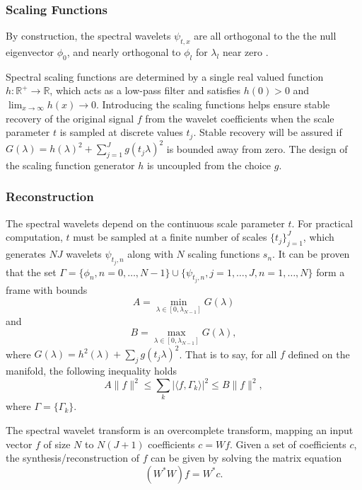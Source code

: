 \subsubsection*{Scaling Functions}
By construction, the spectral wavelets $\psi_{t,x}$ are all orthogonal to the the null eigenvector $\phi_0$,
and nearly orthogonal to $\phi_l$ for $\lambda_l$ near zero \cite{Hammond2011}.

Spectral scaling functions are determined by a single real valued function $h:\mathbb{R}^+\to\mathbb{R}$,
which acts as a low-pass filter and satisfies $h(0)>0$ and $\lim_{x\to\infty}h(x)\to 0$.
Introducing the scaling functions helps ensure stable recovery of the original signal $f$ from the wavelet
coefficients when the scale parameter $t$ is sampled at discrete values ${t_j}$.
Stable recovery will be assured if $G(\lambda)=h(\lambda)^2+\sum_{j=1}^J g(t_j\lambda)^2$ is
bounded away from zero. The design of the scaling function generator $h$ is uncoupled from the choice $g$.

\subsubsection*{Reconstruction}

The spectral wavelets depend on the continuous scale parameter $t$. For practical computation,
$t$ must be sampled at a finite number of scales $\{t_j\}_{j=1}^J$, which generates
$NJ$ wavelets $\psi_{t_j,n}$ along with $N$ scaling functions $s_n$. It can be proven~\cite{Hammond2011}
that the set $\Gamma=\{\phi_n,n=0,\ldots,N-1\}\cup\{\psi_{t_j,n},j=1,\ldots,J,n=1,\ldots,N\}$
form a frame with bounds
\begin{equation*}
A=\min_{\lambda\in[0,\lambda_{N-1}]}G(\lambda)
\end{equation*}
and
\begin{equation*}
B=\max_{\lambda\in[0,\lambda_{N-1}]}G(\lambda),
\end{equation*}
where $G(\lambda)=h^2(\lambda)+\sum_j g(t_j\lambda)^2$. That is to say, for all $f$ defined on the manifold, the following inequality holds
\begin{equation}
A\|f\|^2\leq\sum_k|\langle f,\Gamma_k\rangle|^2\leq B\|f\|^2,
\end{equation}
where $\Gamma=\{\Gamma_k\}$.

The spectral wavelet transform is an overcomplete transform, mapping
an input vector $f$ of size $N$ to $N(J+1)$ coefficients $c=Wf$.
Given a set of coefficients $c$, the synthesis/reconstruction of $f$ can be given by solving the matrix equation
\begin{equation}
(W^*W)f=W^*c.
\end{equation}

